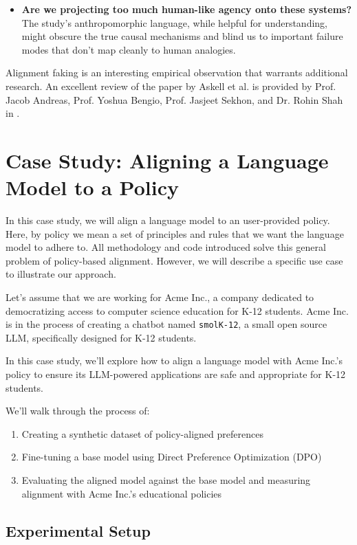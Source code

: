 \begin{itemize}
\item \textbf{Are we projecting too much human-like agency onto these systems?} The study's anthropomorphic language, while helpful for understanding, might obscure the true causal mechanisms and blind us to important failure modes that don't map cleanly to human analogies.
\end{itemize}

Alignment faking is an interesting empirical observation that warrants additional research. An excellent review of the paper by Askell et al. is provided by Prof. Jacob Andreas, Prof. Yoshua Bengio, Prof. Jasjeet Sekhon, and Dr. Rohin Shah in .


\section{Case Study: Aligning a Language Model to a Policy}
\label{section:alignment-case-study}

In this case study, we will align a language model to an user-provided policy. Here, by policy we mean a set of principles and rules that we want the language model to adhere to. All methodology and code introduced solve this general problem of policy-based alignment. However, we will describe a specific use case to illustrate our approach.

Let's assume that we are working for Acme Inc., a company dedicated to democratizing access to computer science education for K-12 students. Acme Inc. is in the process of creating a chatbot named \texttt{smolK-12}, a small open source LLM, specifically designed for K-12 students.

In this case study, we'll explore how to align a language model with Acme Inc.'s policy to ensure its LLM-powered applications are safe and appropriate for K-12 students.

We'll walk through the process of:
\begin{enumerate}
\item Creating a synthetic dataset of policy-aligned preferences
\item Fine-tuning a base model using Direct Preference Optimization (DPO)
\item Evaluating the aligned model against the base model and measuring alignment with Acme Inc.'s educational policies
\end{enumerate}

\subsection{Experimental Setup}

